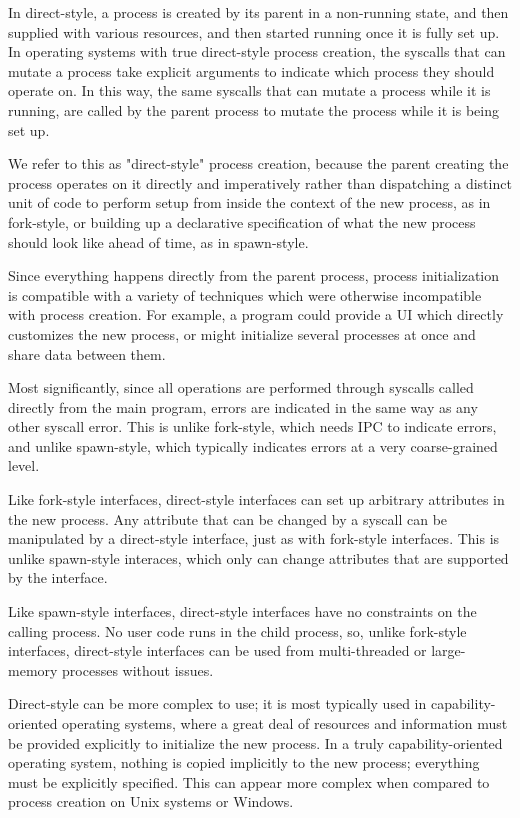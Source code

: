 \documentclass{acmart}
\begin{document}
In direct-style, a process is created by its parent in a non-running state,
and then supplied with various resources,
and then started running once it is fully set up.
In operating systems with true direct-style process creation,
the syscalls that can mutate a process
take explicit arguments to indicate which process they should operate on.
In this way, the same syscalls that can mutate a process while it is running,
are called by the parent process to mutate the process while it is being set up.

We refer to this as "direct-style" process creation,
because the parent creating the process operates on it directly and imperatively
rather than dispatching a distinct unit of code to perform setup from inside the context of the new process,
as in fork-style,
or building up a declarative specification of what the new process should look like ahead of time,
as in spawn-style.

Since everything happens directly from the parent process,
process initialization is compatible with a variety of techniques
which were otherwise incompatible with process creation.
For example, a program could provide a UI which directly customizes the new process,
or might initialize several processes at once and share data between them.

Most significantly,
since all operations are performed through syscalls called directly from the main program,
errors are indicated in the same way as any other syscall error.
This is unlike fork-style, which needs IPC to indicate errors,
and unlike spawn-style, which typically indicates errors at a very coarse-grained level.

Like fork-style interfaces,
direct-style interfaces can set up arbitrary attributes in the new process.
Any attribute that can be changed by a syscall
can be manipulated by a direct-style interface,
just as with fork-style interfaces.
This is unlike spawn-style interaces,
which only can change attributes that are supported by the interface.

Like spawn-style interfaces,
direct-style interfaces have no constraints on the calling process.
No user code runs in the child process,
so, unlike fork-style interfaces,
direct-style interfaces can be used from multi-threaded or large-memory processes without issues.

Direct-style can be more complex to use;
it is most typically used in capability-oriented operating systems,
where a great deal of resources and information must be provided explicitly to initialize the new process.
In a truly capability-oriented operating system,
nothing is copied implicitly to the new process;
everything must be explicitly specified.
This can appear more complex
when compared to process creation on Unix systems or Windows.
\end{document}
